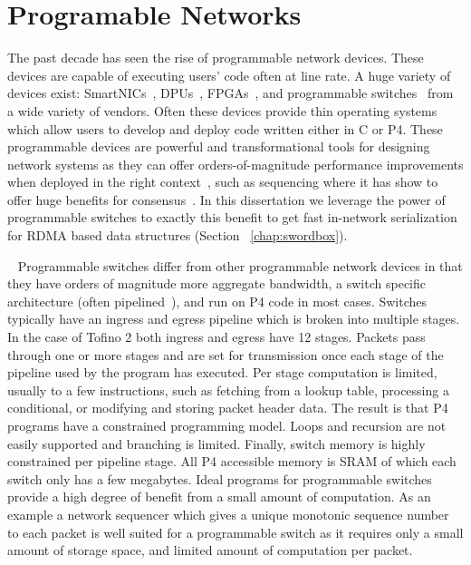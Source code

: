 \documentclass[12pt]{ucsddissertation}
\begin{document}
\section{Programable Networks}

The past decade has seen the rise of programmable network devices. These devices are capable of
executing users' code often at line rate. A huge variety of devices exist:
SmartNICs~\cite{fairnic,e3,ipipe,floem}, DPUs~\cite{dsnf},
FPGAs~\cite{azure-smartnic,clio,catapult,supernic}, and programmable
switches~\cite{p4,netchain,netcache,netlock} from a wide variety of vendors. Often these devices
provide thin operating systems which allow users to develop and deploy code written either in C or
P4. These programmable devices are powerful and transformational tools for designing network systems
as they can offer orders-of-magnitude performance improvements when deployed in the right
context~\cite{when-computer}, such as sequencing where it has show to offer huge benefits for
consensus~\cite{eris, nopaxos}. In this dissertation we leverage the power of programmable switches
to exactly this benefit to get fast in-network serialization for RDMA based data structures (Section
~\ref{chap:swordbox}).

~ Programmable switches differ from other
programmable network devices in that they have orders of magnitude more aggregate bandwidth, a
switch specific architecture (often pipelined~\cite{tofino2}), and run on P4 code in most cases.
Switches typically have an ingress and egress pipeline which is broken into multiple stages. In the
case of Tofino 2 both ingress and egress have 12 stages. Packets pass through one or more stages and
are set for transmission once each stage of the pipeline used by the program has executed. Per stage
computation is limited, usually to a few instructions, such as fetching from a lookup table,
processing a conditional, or modifying and storing packet header data. The result is that P4
programs have a constrained programming model. Loops and recursion are not easily supported and
branching is limited. Finally, switch memory is highly constrained per pipeline stage. All P4
accessible memory is SRAM of which each switch only has a few megabytes.
Ideal programs for programmable switches provide a high degree of benefit from a small amount of
computation. As an example a network sequencer which gives a unique monotonic sequence number to
each packet is well suited for a programmable switch as it requires only a small amount of
storage space, and limited amount of computation per packet.
\end{document}
